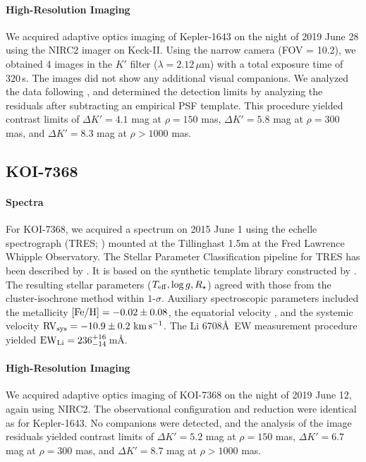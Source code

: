 \documentclass[12pt,twocolumn,tighten,linenumbers,trackchanges]{aastex63}
\newcommand{\mkms}{{\rm \,km\,s^{-1}}}  %
\begin{document}
\paragraph{High-Resolution Imaging}
We acquired adaptive optics imaging of Kepler-1643 on the night of
2019 June 28 using the NIRC2 imager on Keck-II.  Using the narrow
camera (FOV = 10.2\arcsec), we obtained 4 images in the $K'$ filter
($\lambda = 2.12\,\mu$m) with a total exposure time of 320\,s. 
The images did not show any additional visual companions.
We analyzed the data following \citet{kraus_impact_2016}, and
determined the detection limits by analyzing the residuals after
subtracting an empirical PSF template.  This procedure yielded
contrast limits of $\Delta K' = 4.1$ mag at $\rho = 150$ mas, $\Delta
K' = 5.8$ mag at $\rho = 300$ mas, and $\Delta K' = 8.3$ mag
at $\rho > 1000$ mas.


\subsection{KOI-7368}
\paragraph{Spectra}
For KOI-7368, we acquired a spectrum on 2015 June 1 using the echelle
spectrograph (TRES; \citealt{furesz_tres_2008}) mounted at the
Tillinghast 1.5m at the Fred Lawrence Whipple Observatory.  The
Stellar Parameter Classification pipeline for TRES has been described
by \citet{2021tsc2.confE.124B}.  It is based on the synthetic template
library constructed by \citet{Buchhave2012}.  The resulting stellar
parameters ($T_{\rm eff}, \log g, R_\star$) agreed with those from the
cluster-isochrone method within $1$-$\sigma$.  Auxiliary
spectroscopic parameters included the metallicity $[{\rm Fe/H}]= -0.02
\pm 0.08$, the equatorial velocity \replaced{$v\sin i = 20.21 \pm 0.50\,\mkms$}{$v\sin i = 20.2 \pm 1.0\,\mkms$},
and the systemic velocity ${\rm RV}_{\rm sys} = -10.9 \pm 0.2\,\mkms$.
The Li 6708\AA\ EW measurement procedure yielded ${\rm EW}_{\rm Li} =
236^{+16}_{-14}$\,m\AA.

\paragraph{High-Resolution Imaging}
We acquired adaptive optics imaging of KOI-7368 on the night of 2019
June 12, again using NIRC2.  The observational configuration and
reduction were identical as for Kepler-1643.  No companions were
detected, and the analysis of the image residuals yielded contrast
limits of $\Delta K' = 5.2$ mag at $\rho = 150$ mas, $\Delta K' = 6.7$
mag at $\rho = 300$ mas, and $\Delta K' = 8.7$ mag at $\rho > 1000$
mas.
\end{document}
